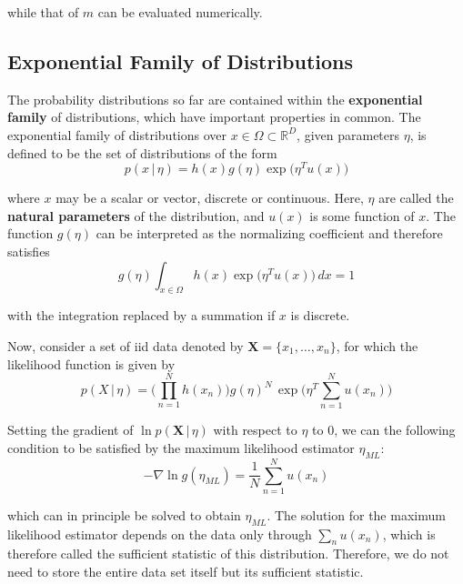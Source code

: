 \documentclass{article}
\begin{document}
    while that of $m$ can be evaluated numerically.

  \subsection{Exponential Family of Distributions}

    The probability distributions so far are contained within the \textbf{exponential family} of distributions, which have important properties in common. The exponential family of distributions over $x \in \Omega \subset \mathbb{R}^D$, given parameters $\eta$, is defined to be the set of distributions of the form
    \begin{equation}
      p(x\,|\,\eta) = h(x) g(\eta) \exp\big(\eta^T u(x)\big)
    \end{equation}

    where $x$ may be a scalar or vector, discrete or continuous. Here, $\eta$ are called the \textbf{natural parameters} of the distribution, and $u(x)$ is some function of $x$. The function $g(\eta)$ can be interpreted as the normalizing coefficient and therefore satisfies
    \begin{equation}
      g(\eta) \int_{x \in \Omega} h(x) \exp\big(\eta^T u(x)\big) \, dx = 1
    \end{equation}

    with the integration replaced by a summation if $x$ is discrete.

    Now, consider a set of iid data denoted by $\mathbf{X} = \{x_1, \ldots, x_n\}$, for which the likelihood function is given by
    \begin{equation}
      p(X\,|\,\eta) = \bigg( \prod_{n=1}^N h(x_n) \bigg) g(\eta)^N\, \exp \bigg( \eta^T \sum_{n=1}^N u(x_n) \bigg)
    \end{equation}

    Setting the gradient of $\ln p(\mathbf{X}\,|\, \eta)$ with respect to $\eta$ to $0$, we can the following condition to be satisfied by the maximum likelihood estimator $\eta_{ML}$:
    \begin{equation}
      -\nabla \ln g(\eta_{ML}) = \frac{1}{N} \sum_{n=1}^N u(x_n)
    \end{equation}

    which can in principle be solved to obtain $\eta_{ML}$. The solution for the maximum likelihood estimator depends on the data only through $\sum_n u(x_n)$, which is therefore called the sufficient statistic of this distribution. Therefore, we do not need to store the entire data set itself but its sufficient statistic.
\end{document}
